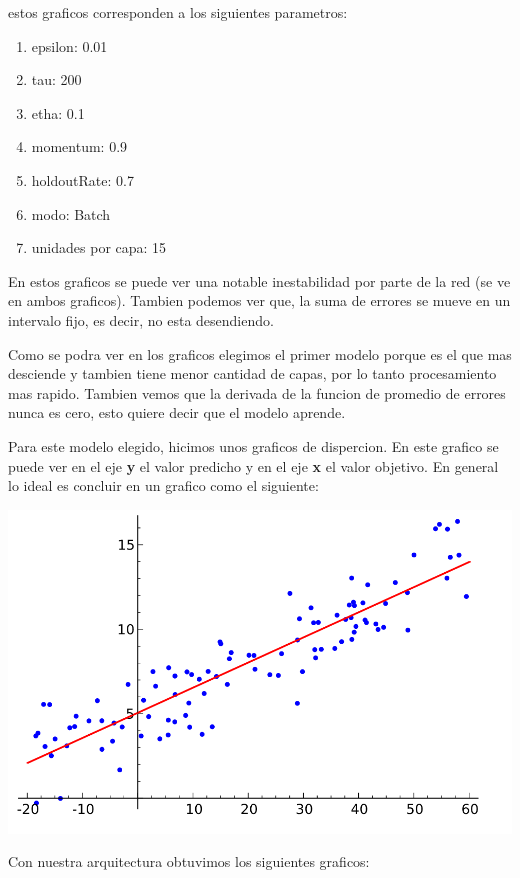 estos graficos corresponden a los siguientes parametros:

\begin{enumerate}
\item epsilon: 0.01
\item tau: 200
\item etha: 0.1
\item momentum: 0.9
\item holdoutRate: 0.7
\item modo: Batch
\item unidades por capa: 15
\end{enumerate}
En estos graficos se puede ver una notable inestabilidad por parte de la red (se ve en ambos graficos). Tambien podemos ver que, la suma de errores se mueve en un intervalo fijo, es decir, no esta desendiendo. 

Como se podra ver en los graficos elegimos el primer modelo porque es el que mas desciende y tambien tiene menor cantidad de capas, por lo tanto procesamiento mas rapido. Tambien vemos que la derivada de la funcion de promedio de errores nunca es cero, esto quiere decir que el modelo aprende.


Para este modelo elegido, hicimos unos graficos de dispercion. 
En este grafico se puede ver en el eje \textbf{y} el valor predicho y en el eje \textbf{x} el valor objetivo. En general lo ideal es concluir en un grafico como el siguiente:

\includegraphics[scale=0.4]{img/regresionperfecta}

Con nuestra arquitectura obtuvimos los siguientes graficos:

